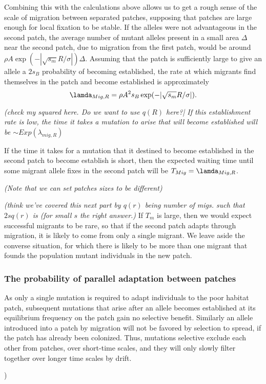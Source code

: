\documentclass{article}
\newcommand{\gc}[1]{{ \it \color{green} (#1) } }
\begin{document}
Combining this with the calculations above allows us to get a rough sense of the scale of migration between separated patches,
supposing that patches are large enough for local fixation to be stable. If the alleles were not advantageous in the second patch,
the average number of mutant alleles present in a small area $\Delta$
near the second patch, due
to migration from the first patch, would be around $\rho A \exp( -
|\sqrt{s_m} R/\sigma| ) \Delta$. Assuming that the patch is
sufficiently large to give an allele a $2s_B$ probability of becoming established, the rate at which migrants find
themselves in the patch and become established  is approximately
\begin{equation}
\lamda_{Mig,R} = \rho A^2 s_B \exp( -|\sqrt{s_m} R/\sigma| ).
\end{equation}
\gc{check my squared here. Do we want to use $q(R)$ here?|
If this establishment rate is low, the time it takes
a mutation to arise that will become established will be  $\sim Exp(\lambda_{mig,R})$

If  the time it takes for a mutation that it destined to 
become established in the second patch to become establish is short,
then  the expected waiting time until some migrant allele fixes in the
second patch will be $T_{Mig} = \lamda_{Mig,R} $.

\gc{Note that we can set patches sizes to be different}


\gc{think we've covered this next part by $q(r)$ being number of migs. such
that $2sq(r)$ is (for small $s$ the right answer.}
If $T_m$ is large, then we would expect successful migrants to be rare,
so that if the second patch adapts through migration, it is likely to come from only a single migrant.
We leave aside the converse situation, for which there is likely to be more than one migrant
that founds the population mutant individuals in the new patch.


\subsubsection{The probability of parallel adaptation between patches} 
\label{ss:probparallel}

As only a single mutation is required to adapt individuals to the
poor habitat patch, subsequent mutations that arise after an allele
becomes established at its equilibrium frequency on the patch gain no selective
benefit. Similarly an allele introduced into a patch by migration will
not be favored by selection to spread, if the patch has already been
colonized. Thus, mutations selective exclude each other from
patches, over short-time scales, and they will only slowly filter
together over longer time scales by drift. 

}
\end{document}

